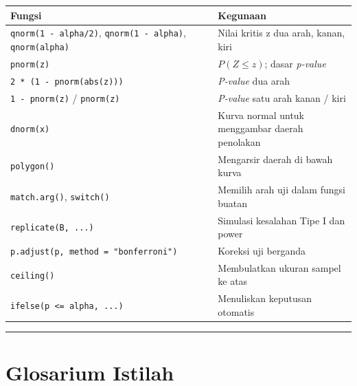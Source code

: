 \documentclass[
  indonesian,
  letterpaper,
]{book}
\newcounter{none} %
\begin{document}
{\def\LTcaptype{none} %
\begin{longtable}[]{@{}
  >{\raggedright\arraybackslash}p{}
  >{\raggedright\arraybackslash}p{}@{}}
\toprule\noalign{}
\begin{minipage}[b]{\linewidth}\raggedright
Fungsi
\end{minipage} & \begin{minipage}[b]{\linewidth}\raggedright
Kegunaan
\end{minipage} \\
\midrule\noalign{}
\endhead
\bottomrule\noalign{}
\endlastfoot
\texttt{qnorm(1\ -\ alpha/2)}, \texttt{qnorm(1\ -\ alpha)},
\texttt{qnorm(alpha)} & Nilai kritis z dua arah, kanan, kiri \\
\texttt{pnorm(z)} & \(P(Z \leq z)\); dasar \emph{p-value} \\
\texttt{2\ *\ (1\ -\ pnorm(abs(z)))} & \emph{P-value} dua arah \\
\texttt{1\ -\ pnorm(z)} / \texttt{pnorm(z)} & \emph{P-value} satu arah
kanan / kiri \\
\texttt{dnorm(x)} & Kurva normal untuk menggambar daerah penolakan \\
\texttt{polygon()} & Mengarsir daerah di bawah kurva \\
\texttt{match.arg()}, \texttt{switch()} & Memilih arah uji dalam fungsi
buatan \\
\texttt{replicate(B,\ ...)} & Simulasi kesalahan Tipe I dan power \\
\texttt{p.adjust(p,\ method\ =\ "bonferroni")} & Koreksi uji berganda \\
\texttt{ceiling()} & Membulatkan ukuran sampel ke atas \\
\texttt{ifelse(p\ \textless{}=\ alpha,\ ...)} & Menuliskan keputusan
otomatis \\
\end{longtable}
}

\begin{center}\rule{0.5\linewidth}{0.5pt}\end{center}

\section{Glosarium Istilah}\label{glosarium-istilah-1}
\end{document}
